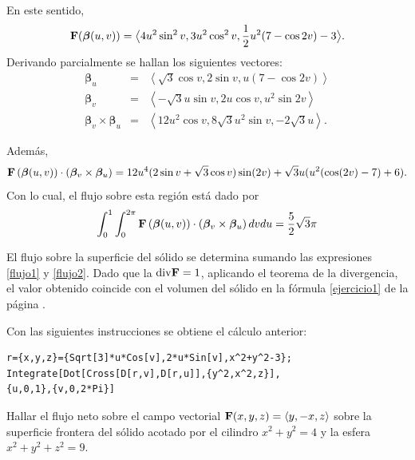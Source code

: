 \begin{parrafonumerado}
En este sentido,
\[{\bf F}({\bm \beta}(u,v))=\big \langle 4u^2\sin^2v,3u^2\cos^2v, \linebreak
\frac{1}{2}u^{2}(7-\cos 2v)-3\big \rangle .\]
Derivando parcialmente se hallan los siguientes vectores:
{\small
\begin{eqnarray*}
{\bm \beta}_{u}&=&\left\langle \sqrt{3}\cos v,2\sin v,u\left( 7-\cos 2v\right)\right\rangle \\
{\bm \beta}_{v}&=&\left\langle -\sqrt{3}u\sin v,2u\cos v,u^{2}\sin 2v\right\rangle \\
{\bm \beta}_{v}\times {\bm \beta}_{u}&=&\left\langle 12u^{2}\cos v,8\sqrt{3}u^{2}\sin v,-2\sqrt{3}u\right\rangle\!.
\end{eqnarray*}
}

Además,
{\footnotesize
\begin{multline*}
{\bf F}\left({\bm \beta}(u,v)\right) \cdot \left({\bm \beta}_{v}\times {\bm \beta}_{u}\right)
= 12u^{4}(2\sin v+\sqrt{3}\cos v)\sin(2v)+\sqrt{3}u(u^{2}(\cos(2v)-7) +6).
\end{multline*}
}
Con lo cual, el flujo sobre esta región está dado por
{\small
\begin{equation}\label{flujo2}
\int_{0}^{1}\int_{0}^{2\pi}{\bf F}\left({\bm \beta}(u,v)\right) \cdot \left({\bm \beta}_{v}\times {\bm \beta}_{u}\right)dvdu=\frac{5}{2}\sqrt{3}\pi
\end{equation}
}

El flujo sobre la superficie del sólido se determina sumando las expresiones \ref{flujo1} y \ref{flujo2}.
Dado que la ${\rm div}{\bf F}=1$, aplicando el teorema de la divergencia, el valor obtenido coincide con el volumen del sólido en la fórmula \ref{ejercicio1} de la página \pageref{ejercicio1}.

Con las siguientes instrucciones se obtiene el cálculo anterior:

\begin{tcolorbox}[title=\bf Instrucción \verb"Mathematica"]\begin{Verbatim}[formatcom=\letraverbatim]
r={x,y,z}={Sqrt[3]*u*Cos[v],2*u*Sin[v],x^2+y^2-3};
Integrate[Dot[Cross[D[r,v],D[r,u]],{y^2,x^2,z}],
{u,0,1},{v,0,2*Pi}]
\end{Verbatim}
\end{tcolorbox}

\item Hallar el flujo neto sobre el campo vectorial
${\bf F}(x,y,z) = \left \langle y,-x,z \right \rangle $ sobre la superficie frontera del sólido acotado por el cilindro $x^2+y^2=4$ y la esfera $x^2+y^2+z^2=9$.


\end{parrafonumerado}
